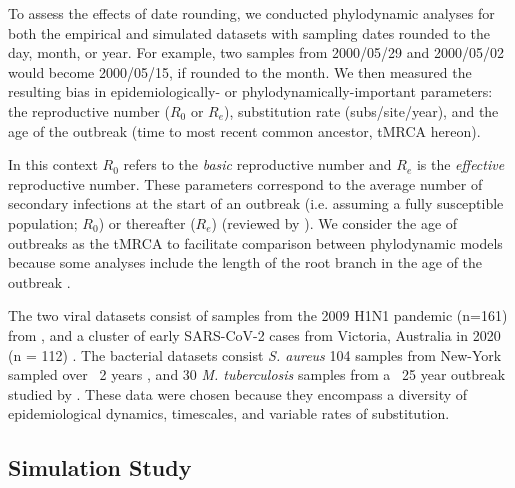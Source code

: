 \documentclass{article}
\begin{document}
\begin{spacing}{1.5}
To assess the effects of date rounding, we conducted phylodynamic analyses for both the empirical and simulated datasets with sampling dates rounded to the day, month, or year. For example, two samples from 2000/05/29 and 2000/05/02 would become 2000/05/15, if rounded to the month. We then measured the resulting bias in epidemiologically- or phylodynamically-important parameters: the reproductive number ($R_0$ or $R_e$), substitution rate (subs/site/year), and the age of the outbreak (time to most recent common ancestor, tMRCA hereon). 

In this context $R_0$ refers to the \textit{basic} reproductive number and $R_e$ is the \textit{effective} reproductive number. These parameters correspond to the average number of secondary infections at the start of an outbreak (i.e. assuming a fully susceptible population; $R_0$) or thereafter ($R_e$) (reviewed by \citep{featherstone2022epidemiological, du2015getting, kuhnert2011phylogenetic}). We consider the age of outbreaks as the tMRCA to facilitate comparison between phylodynamic models because some analyses include the length of the root branch in the age of the outbreak \citep{stadler2012estimating}.

The two viral datasets consist of samples from the 2009 H1N1 pandemic (n=161) from \citet{hedge_2013_real-time}, and a cluster of early SARS-CoV-2 cases from  Victoria, Australia in 2020 (n = 112) \citep{lane2021genomics}. The bacterial datasets consist \textit{S. aureus} 104 samples from New-York sampled over ~2 years \citet{duchene_2016_genome,volz_modeling_2018,uhlemann_molecular_2014}, and 30 \textit{M. tuberculosis} samples from a ~25 year outbreak studied by \citet{kuhnert_tuberculosis_2018}. These data were chosen because they encompass a diversity of epidemiological dynamics, timescales, and variable rates of substitution.

\subsection*{Simulation Study}


\end{spacing}
\end{document}
